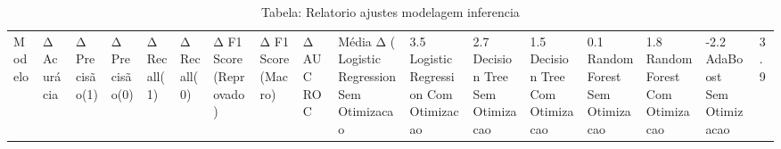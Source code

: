 \begin{table}[H] %
    \centering
    \caption{Tabela: Relatorio ajustes modelagem inferencia}
    \label{tab:relatorio_ajustes_modelagem_inferencia}
    \renewcommand{\arraystretch}{1.25} %
    \begin{adjustwidth}{ -1in }{ -1in } %
    \centering %
    \small %
    \begin{tabular}{lllllllllll}
\toprule
                            Modelo & Δ Acurácia & Δ Precisão(1) & Δ Precisão(0) & Δ Recall(1) & Δ Recall(0) & Δ F1 Score (Reprovado) & Δ F1 Score (Macro) & Δ AUC ROC & Média Δ (%
\midrule
Logistic Regression Sem Otimizacao &       3.5%
Logistic Regression Com Otimizacao &       2.7%
      Decision Tree Sem Otimizacao &       1.5%
      Decision Tree Com Otimizacao &       0.1%
      Random Forest Sem Otimizacao &       1.8%
      Random Forest Com Otimizacao &      -2.2%
           AdaBoost Sem Otimizacao &       3.9%

\end{tabular}
\end{adjustwidth}
\end{table}
